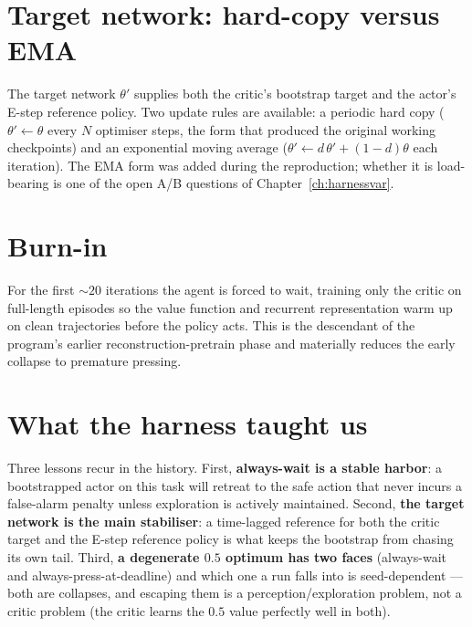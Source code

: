 \section{Target network: hard-copy versus EMA}
The target network $\theta'$ supplies both the critic's bootstrap target and the actor's
E-step reference policy. Two update rules are available: a periodic hard copy ($\theta'\!
\leftarrow\!\theta$ every $N$ optimiser steps, the form that produced the original working
checkpoints) and an exponential moving average ($\theta'\!\leftarrow\!d\,\theta'+(1-d)
\theta$ each iteration). The EMA form was added during the reproduction; whether it is
load-bearing is one of the open A/B questions of Chapter~\ref{ch:harnessvar}.

\section{Burn-in}
For the first $\sim\!20$ iterations the agent is forced to wait, training only the critic
on full-length episodes so the value function and recurrent representation warm up on clean
trajectories before the policy acts. This is the descendant of the program's earlier
reconstruction-pretrain phase and materially reduces the early collapse to premature
pressing.

\section{What the harness taught us}
Three lessons recur in the history. First, \textbf{always-wait is a stable harbor}: a
bootstrapped actor on this task will retreat to the safe action that never incurs a
false-alarm penalty unless exploration is actively maintained. Second, \textbf{the target
network is the main stabiliser}: a time-lagged reference for both the critic target and
the E-step reference policy is what keeps the bootstrap from chasing its own tail. Third,
\textbf{a degenerate $0.5$ optimum has two faces} (always-wait and always-press-at-deadline)
and which one a run falls into is seed-dependent --- both are collapses, and escaping them
is a perception/exploration problem, not a critic problem (the critic learns the $0.5$
value perfectly well in both).
